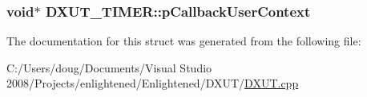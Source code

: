 \label{struct_d_x_u_t___t_i_m_e_r_aebbdf57604305732406ad29ae90214f0}
\hypertarget{struct_d_x_u_t___t_i_m_e_r_a5c7f0df10a281ce4edfc8fd74e7120bf}{
\subsubsection[{pCallbackUserContext}]{\setlength{\rightskip}{0pt plus 5cm}void$\ast$ {\bf DXUT\_\-TIMER::pCallbackUserContext}}}
\label{struct_d_x_u_t___t_i_m_e_r_a5c7f0df10a281ce4edfc8fd74e7120bf}


The documentation for this struct was generated from the following file:\begin{DoxyCompactItemize}
\item 
C:/Users/doug/Documents/Visual Studio 2008/Projects/enlightened/Enlightened/DXUT/\hyperlink{_d_x_u_t_8cpp}{DXUT.cpp}\end{DoxyCompactItemize}
